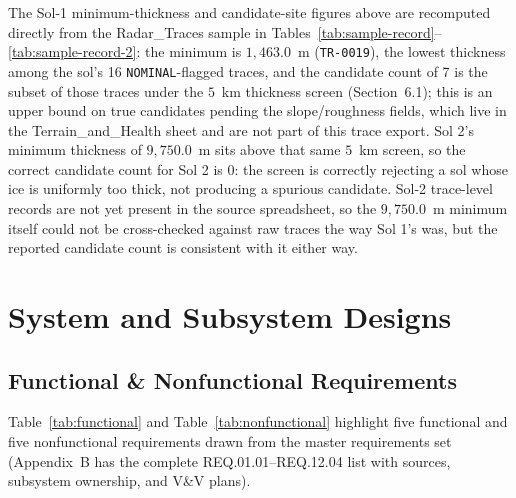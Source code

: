 \documentclass[11pt]{article}
\begin{document}
The Sol-1 minimum-thickness and candidate-site figures above are recomputed directly from the
Radar\_Traces sample in Tables~\ref{tab:sample-record}--\ref{tab:sample-record-2}: the minimum is
$1{,}463.0$~m (\texttt{TR-0019}), the lowest thickness among the sol's 16 \texttt{NOMINAL}-flagged
traces, and the candidate count of 7 is the subset of those traces under the $5$~km thickness
screen (Section~6.1); this is an upper bound on true candidates pending the slope/roughness
fields, which live in the Terrain\_and\_Health sheet and are not part of this trace export. Sol
2's minimum thickness of $9{,}750.0$~m sits above that same $5$~km screen, so the correct
candidate count for Sol 2 is $0$: the screen is correctly rejecting a sol whose ice is uniformly
too thick, not producing a spurious candidate. Sol-2 trace-level records are not yet present in
the source spreadsheet, so the $9{,}750.0$~m minimum itself could not be cross-checked against raw
traces the way Sol 1's was, but the reported candidate count is consistent with it either way.

\section{System and Subsystem Designs}

\subsection{Functional \& Nonfunctional Requirements}

Table~\ref{tab:functional} and Table~\ref{tab:nonfunctional} highlight five functional and five
nonfunctional requirements drawn from the master requirements set (Appendix~B has the complete
REQ.01.01--REQ.12.04 list with sources, subsystem ownership, and V\&V plans).
\end{document}
